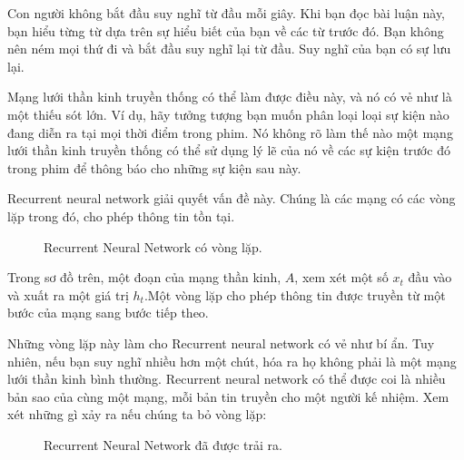 Con người không bắt đầu suy nghĩ từ đầu mỗi giây.
Khi bạn đọc bài luận này, bạn hiểu từng từ dựa trên sự hiểu biết của bạn về các từ trước đó.
Bạn không nên ném mọi thứ đi và bắt đầu suy nghĩ lại từ đầu. Suy nghĩ của bạn
có sự lưu lại.

Mạng lưới thần kinh truyền thống có thể làm được điều này, và nó có vẻ như là một
thiếu sót lớn.
Ví dụ, hãy tưởng tượng bạn muốn phân loại loại sự kiện nào đang diễn ra tại mọi thời điểm trong phim.
Nó không rõ làm thế nào một mạng lưới thần kinh truyền thống có thể sử dụng lý lẽ của nó về các sự kiện trước đó trong phim để thông báo cho những sự kiện sau này.

Recurrent neural network giải quyết vấn đề này. Chúng là các mạng có các vòng lặp trong đó, cho phép thông tin tồn tại.
\begin{figure}[H]
    \caption{\label{fig:rnn-rolled} Recurrent Neural Network có vòng lặp.}
\end{figure}

Trong sơ đồ trên, một đoạn của mạng thần kinh, \(A\), xem xét một số \(x_t\) đầu vào và xuất ra một giá trị
\(h_t\).Một vòng lặp cho phép thông tin được truyền từ một bước của mạng sang bước tiếp theo.

Những vòng lặp này làm cho Recurrent neural network có vẻ như bí ẩn.
Tuy nhiên, nếu bạn suy nghĩ nhiều hơn một chút, hóa ra họ không phải là một mạng lưới thần kinh bình thường.
Recurrent neural network có thể được coi là nhiều bản sao của cùng một mạng, mỗi bản tin truyền cho một người kế nhiệm.
Xem xét những gì xảy ra nếu chúng ta bỏ vòng lặp:

\begin{figure}[H]
    \caption{\label{fig:rnn-unrolled} Recurrent Neural Network đã được trải ra.}
\end{figure}

